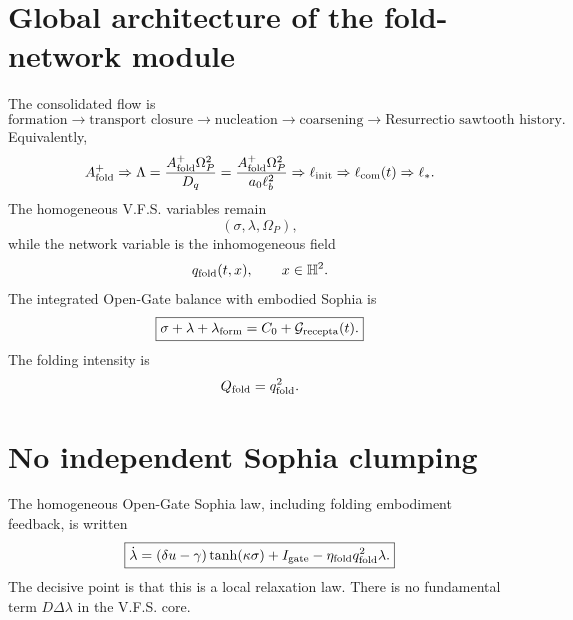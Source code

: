 \documentclass[11pt]{article}
\newcommand{\Op}{\Omega_P}
\newcommand{\qf}{q_{\rm fold}}
\newcommand{\Qf}{Q_{\rm fold}}
\newcommand{\lf}{\lambda_{\rm form}}
\newcommand{\Igate}{I_{\rm gate}}
\newcommand{\Af}{A_{\rm fold}}
\newcommand{\Dq}{D_q}
\newcommand{\etaf}{\eta_{\rm fold}}
\newcommand{\Hh}{\mathbb H^2}
\newcommand{\ellcom}{\ell_{\rm com}}
\newcommand{\ellinit}{\ell_{\rm init}}
\newcommand{\Lam}{\Lambda}
\newcommand{\Grec}{\mathcal G_{\rm recepta}}
\theoremstyle{definition}
\theoremstyle{plain}
\begin{document}
\section{Global architecture of the fold-network module}

The consolidated flow is
\[
\boxed{
\text{formation}
\longrightarrow
\text{transport closure}
\longrightarrow
\text{nucleation}
\longrightarrow
\text{coarsening}
\longrightarrow
\text{Resurrectio sawtooth history}.
}
\]
Equivalently,
\[
\Af^+
\Rightarrow
\Lam
=
\frac{\Af^+\Op^2}{\Dq}
=
\frac{\Af^+\Op^2}{a_0\ell_b^2}
\Rightarrow
\ellinit
\Rightarrow
\ellcom(t)
\Rightarrow
\ell_\ast.
\]
The homogeneous V.F.S. variables remain
\[
(\sigma,\lambda,\Op),
\]
while the network variable is the inhomogeneous field
\[
\qf(t,x),\qquad x\in\Hh.
\]
The integrated Open-Gate balance with embodied Sophia is
\[
\boxed{\sigma+\lambda+\lf=C_0+\Grec(t).}
\]
The folding intensity is
\[
\Qf=\qf^2.
\]

\begin{center}
\end{center}

\section{No independent Sophia clumping}

The homogeneous Open-Gate Sophia law, including folding embodiment feedback, is written
\[
\boxed{
\dot\lambda
=(\delta u-\gamma)\tanh(\kappa\sigma)+\Igate-\etaf\qf^2\lambda.
}
\]
The decisive point is that this is a local relaxation law.  There is no fundamental term
$D\Delta\lambda$ in the V.F.S. core.
\end{document}
